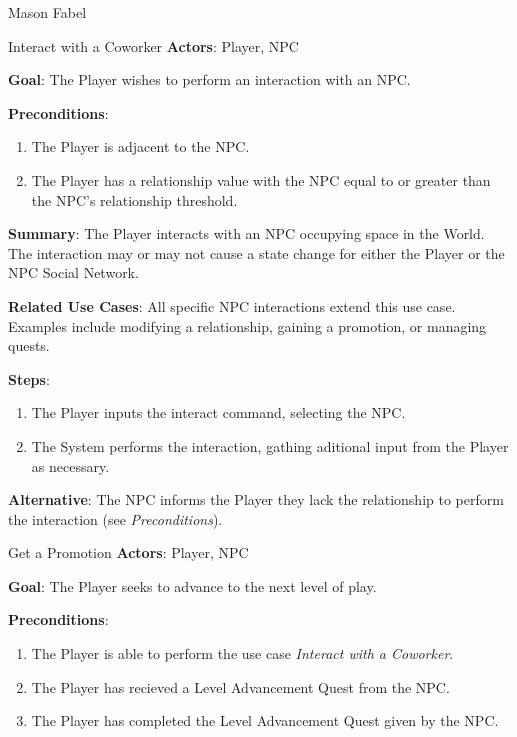 \documentclass[12pt]{report}
\begin{document}
\begin{section}{Mason Fabel}
\begin{subsection}{Interact with a Coworker}
\textbf{Actors}:
Player, NPC

\textbf{Goal}:
The Player wishes to perform an interaction with an NPC.

\textbf{Preconditions}:
\begin{enumerate}
\item The Player is adjacent to the NPC.
\item The Player has a relationship value with the NPC equal to or greater
	than the NPC's relationship threshold.
\end{enumerate}

\textbf{Summary}:
The Player interacts with an NPC occupying space in the World. The
interaction may or may not cause a state change for either the Player or
the NPC Social Network.

\textbf{Related Use Cases}:
All specific NPC interactions extend this use case. Examples include
modifying a relationship, gaining a promotion, or managing quests.

\textbf{Steps}:
\begin{enumerate}
\item The Player inputs the interact command, selecting the NPC.
\item The System performs the interaction, gathing aditional input from the
	Player as necessary.
\end{enumerate}

\textbf{Alternative}:
The NPC informs the Player they lack the relationship to perform the
interaction (see \textit{Preconditions}).
\end{subsection}

\begin{subsection}{Get a Promotion}
\textbf{Actors}:
Player, NPC

\textbf{Goal}:
The Player seeks to advance to the next level of play.

\textbf{Preconditions}:
\begin{enumerate}
\item The Player is able to perform the use case \textit{Interact with a
	Coworker}.
\item The Player has recieved a Level Advancement Quest from the NPC.
\item The Player has completed the Level Advancement Quest given by the
	NPC.
\end{enumerate}


\end{subsection}
\end{section}
\end{document}
